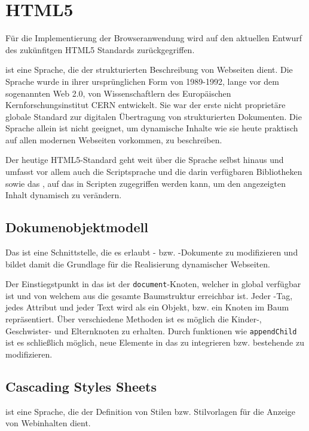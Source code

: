\section{HTML5}

Für die Implementierung der Browseranwendung wird auf den aktuellen Entwurf des  zukünfitgen HTML5
Standards zurückgegriffen. 

 ist eine Sprache, die der strukturierten Beschreibung von Webseiten dient. Die Sprache
wurde in ihrer ursprünglichen Form  von 1989-1992, lange vor dem sogenannten Web 2.0, von
Wissenschaftlern des Europäischen Kernforschungsinstitut CERN entwickelt. Sie war der erste nicht
proprietäre globale Standard zur digitalen Übertragung von strukturierten  Dokumenten. Die Sprache
 allein ist nicht geeignet, um dynamische Inhalte  wie sie heute praktisch auf allen
modernen Webseiten vorkommen, zu beschreiben. 

Der heutige HTML5-Standard geht weit über die Sprache  selbst hinaus und  umfasst vor
allem auch die Scriptsprache  und die darin verfügbaren Bibliotheken sowie das ,
auf das in  Scripten zugegriffen werden kann, um den angezeigten Inhalt dynamisch zu verändern.
\cite{html5}

\subsection{Dokumenobjektmodell}

Das \textit{} ist eine Schnittstelle, die es erlaubt - bzw. -Dokumente zu
modifizieren und bildet damit die Grundlage für die Realisierung dynamischer Webseiten.

Der Einstiegstpunkt in das  ist der \texttt{document}-Knoten, welcher in 
global verfügbar ist und von welchem aus die gesamte Baumstruktur erreichbar ist. Jeder
-Tag, jedes Attribut und jeder Text wird als ein Objekt, bzw. ein Knoten im Baum
repräsentiert. Über verschiedene Methoden ist es möglich die Kinder-, Geschwister- und Elternknoten
zu erhalten. Durch funktionen wie \texttt{appendChild} ist es schließlich möglich, neue Elemente
in das  zu integrieren bzw. bestehende zu modifizieren. \cite{dom}

\subsection{Cascading Styles Sheets}

 ist eine Sprache, die der Definition von  Stilen bzw. Stilvorlagen für die Anzeige von
Webinhalten dient.

